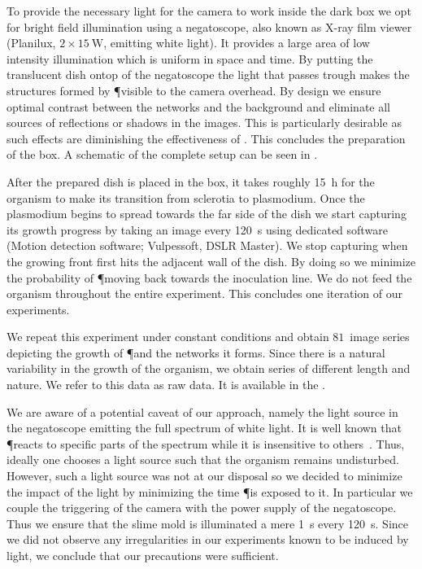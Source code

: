 		To provide the necessary light for the camera to work inside the dark box we opt for bright field illumination using a negatoscope, also known as X-ray film viewer (Planilux, $2 \times \SI{15}{\W}$, emitting white light). It provides a large area of low intensity illumination which is uniform in space and time. By putting the translucent dish ontop of the negatoscope the light that passes trough makes the structures formed by \P visible to the camera overhead. By design we ensure optimal contrast between the networks and the background and eliminate all sources of reflections or shadows in the images. This is particularly desirable as such effects are diminishing the effectiveness of \NEFI. This concludes the preparation of the box. A schematic of the complete setup can be seen in .

		After the prepared dish is placed in the box, it takes roughly \SI{15}{\hour} for the organism to make its transition from sclerotia to plasmodium. Once the plasmodium begins to spread towards the far side of the dish we start capturing its growth progress by taking an image every \SI{120}{\second} using dedicated software (Motion detection software; Vulpessoft, DSLR Master). We stop capturing when the growing front first hits the adjacent wall of the dish. By doing so we minimize the probability of \P moving back towards the inoculation line. We do not feed the organism throughout the entire experiment. This concludes one iteration of our experiments.

		We repeat this experiment under constant conditions and obtain $81$~image series depicting the growth of \P and the networks it forms. Since there is a natural variability in the growth of the organism, we obtain series of different length and nature. We refer to this data as raw data. It is available in the \SMGR.

		We are aware of a potential caveat of our approach, namely the light source in the negatoscope emitting the full spectrum of white light. It is well known that \P reacts to specific parts of the spectrum while it is insensitive to others~\cite{nakagaki1996action}. Thus, ideally one chooses a light source such that the organism remains undisturbed. However, such a light source was not at our disposal so we decided to minimize the impact of the light by minimizing the time \P is exposed to it. In particular we couple the triggering of the camera with the power supply of the negatoscope. Thus we ensure that the slime mold is illuminated a mere \SI{1}{\second} every \SI{120}{\second}. Since we did not observe any irregularities in our experiments known to be induced by light, we conclude that our precautions were sufficient.

